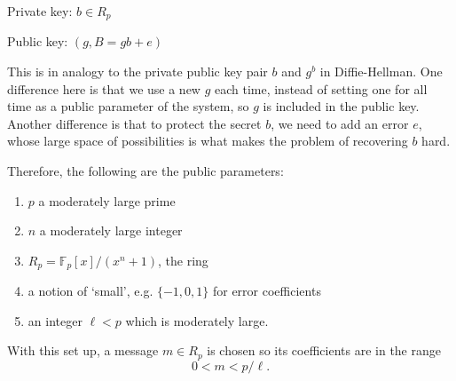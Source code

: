 \documentclass{article}
\theoremstyle{plain}
\theoremstyle{definition}
\theoremstyle{remark}
\numberwithin{theorem}{section}
\newcommand{\FF}{\mathbb{F}}
\begin{document}
Private key:  $b \in R_p$

Public key: $(g, B = gb + e)$

This is in analogy to the private public key pair $b$ and $g^b$ in Diffie-Hellman.  One difference here is that we use a new $g$ each time, instead of setting one for all time as a public parameter of the system, so $g$ is included in the public key.  Another difference is that to protect the secret $b$, we need to add an error $e$, whose large space of possibilities is what makes the problem of recovering $b$ hard.

Therefore, the following are the public parameters:
\begin{enumerate}
\item $p$ a moderately large prime
\item $n$ a moderately large integer
\item $R_p = \FF_p[x]/(x^n+1)$, the ring
\item a notion of `small', e.g. $\{-1,0,1\}$ for error coefficients
\item an integer $\ell < p$ which is moderately large.
\end{enumerate}

With this set up, a message $m \in R_p$ is chosen so its coefficients are in the range
\[
0 < m < p/\ell.
\]
\end{document}
